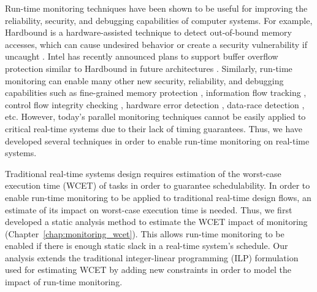 Run-time monitoring techniques have been shown to be useful for improving the
reliability, security, and debugging capabilities of computer systems. For
example, Hardbound is a hardware-assisted technique to detect out-of-bound
memory accesses, which can cause undesired behavior or create a security
vulnerability if uncaught \cite{hardbound-asplos08}. Intel has recently
announced plans to support buffer overflow protection similar to Hardbound in
future architectures \cite{intel-mpx}. Similarly, run-time monitoring can
enable many other new security, reliability, and debugging capabilities such as
fine-grained memory protection \cite{mondrian-asplos02}, information flow
tracking \cite{dift-asplos04, testudo-micro08}, control flow integrity checking
\cite{hafix-dac15}, hardware error detection \cite{argus-micro07}, data-race
detection \cite{radish-isca12, cord-hpca06}, etc.  
However, today's parallel monitoring techniques cannot be easily applied
to critical real-time systems due to their lack of timing guarantees. Thus, we
have developed several techniques in order to enable run-time monitoring on
real-time systems.


Traditional real-time systems design requires estimation of the worst-case
execution time (WCET) of tasks in order to guarantee schedulability. In order to
enable run-time monitoring to be applied to traditional real-time design flows,
an estimate of its impact on worst-case execution time is needed. Thus, we
first developed a static analysis method to estimate the WCET impact of monitoring
(Chapter~\ref{chap:monitoring_wcet}). This allows run-time monitoring to be
enabled if there is enough static slack in a real-time system's schedule.
Our analysis extends the traditional integer-linear programming
(ILP) formulation used for estimating WCET by adding new constraints in order
to model the impact of run-time monitoring.

